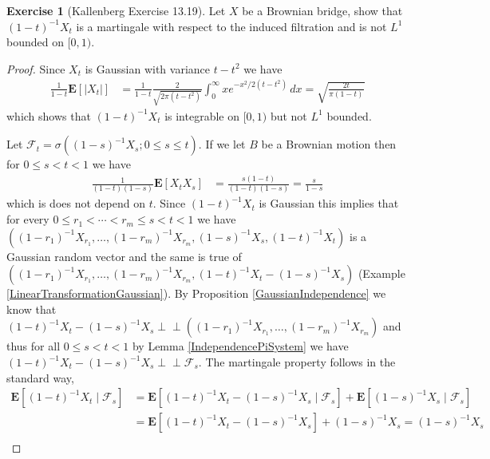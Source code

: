 \documentclass{amsbook}
\theoremstyle{definition}
\newtheorem{xca}{Exercise}
\theoremstyle{remark}
\newcommand{\Independent}{\perp \! \! \! \perp}
\newcommand{\expectation}[1]{\textbf{E}\left[#1\right]}
\newcommand{\cexpectationlong}[2]{\textbf{E}\left[ #2 \mid #1 \right]}
\newcommand{\abs}[1]{\left \vert #1 \right \vert}
\begin{document}
\begin{xca}[Kallenberg Exercise 13.19]\label{BrownianBridgeMartingale}Let $X$ be a Brownian bridge,
  show that $(1-t)^{-1}X_t$ is a martingale with respect to the
  induced filtration and is not $L^1$ bounded on $[0,1)$.
\end{xca}
\begin{proof}
Since $X_t$ is Gaussian with variance $t -t^2$ we have 
\begin{align*}
\frac{1}{1-t} \expectation{\abs{X_t}} &= \frac{1}{1-t}\frac{2}{\sqrt{2\pi(t - t^2)}}
                          \int_0^\infty x e^{-x^2/2(t - t^2)} \, dx = \sqrt{\frac{2t}{\pi(1-t)}}
\end{align*}
which shows that $(1 -t)^{-1}X_t$ is integrable on $[0,1)$ but not
$L^1$ bounded.  

Let $\mathcal{F}_t = \sigma((1-s)^{-1} X_s; 0 \leq s \leq t)$.  If we let $B$ be a Brownian motion then for $0 \leq s < t < 1$ we have
\begin{align*}
\frac{1}{(1-t)(1-s)} \expectation{X_t X_s} 
&=\frac{s(1-t)}{(1-t)(1-s)} = \frac{s}{1-s}
\end{align*}
which is does not depend on $t$.  Since $(1-t)^{-1}X_t$ is Gaussian this implies that for every $0 \leq r_1 < \dotsb < r_m \leq s < t < 1$ we have
$((1-r_1)^{-1}X_{r_1}, \dotsc, (1-r_m)^{-1}X_{r_m}, (1-s)^{-1}X_{s}, (1-t)^{-1}X_{t})$ is a Gaussian random vector and the same is true of
$((1-r_1)^{-1}X_{r_1}, \dotsc, (1-r_m)^{-1}X_{r_m}, (1-t)^{-1}X_{t} - (1-s)^{-1}X_{s})$ (Example \ref{LinearTransformationGaussian}).
By Proposition \ref{GaussianIndependence} we know that $(1-t)^{-1}X_{t} - (1-s)^{-1}X_{s} \Independent ((1-r_1)^{-1}X_{r_1}, \dotsc, (1-r_m)^{-1}X_{r_m})$ and
thus for all $0 \leq s < t < 1$ by Lemma \ref{IndependencePiSystem} we have $(1-t)^{-1}X_{t} - (1-s)^{-1}X_{s} \Independent \mathcal{F}_s$. 
The martingale property follows in the standard way,
\begin{align*}
\cexpectationlong{\mathcal{F}_s}{(1-t)^{-1}X_t}
&=\cexpectationlong{\mathcal{F}_s}{(1-t)^{-1}X_t - (1-s)^{-1}X_s} + 
\cexpectationlong{\mathcal{F}_s}{(1-s)^{-1}X_s} \\
&=\expectation{(1-t)^{-1}X_t - (1-s)^{-1}X_s} + (1-s)^{-1}X_s =   (1-s)^{-1}X_s\\
\end{align*}
\end{proof}
\end{document}
